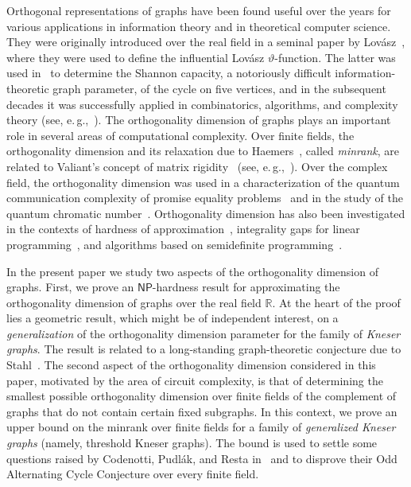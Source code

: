 \documentclass[11pt]{article}
\numberwithin{equation}{section}
\theoremstyle{definition}
\theoremstyle{plain}
\newcommand{\R}{\mathbb R}
\newcommand{\NP}{\mathsf{NP}}
\begin{document}
Orthogonal representations of graphs have been found useful over the years for various applications in information theory and in theoretical computer science.
They were originally introduced over the real field in a seminal
%
paper by  %
Lov\'asz~\cite{Lovasz79}, where they were used to define the influential Lov\'asz $\vartheta$-function. The latter was used in~\cite{Lovasz79} to determine the Shannon capacity, a notoriously difficult information-theoretic graph parameter, of the cycle on five vertices, and in the
%
subsequent decades  %
%
%
it was successfully applied in combinatorics, algorithms, and complexity theory (see, e.\,g.,~\cite{Tardos88,knuth1994sandwich,Feige97,AlonK98}).
%
%
%
The orthogonality dimension of graphs plays an important role in several areas of computational complexity.
Over finite fields, the orthogonality dimension and its
%
%
%
relaxation due to Haemers~\cite{Haemers79, Haemers81}, %
%
%
called \emph{minrank},  %
%
%
%
are related to Valiant's concept of matrix rigidity~\cite{Valiant77} (see, e.\,g.,~\cite{CodenottiPR00,Riis07,GolovnevRW17}).
Over the complex field, the orthogonality dimension was used in a characterization of the quantum communication complexity of promise equality problems~\cite{deWolfThesis,BrietBLPS15,BrietZ17} and in the study of the quantum chromatic number~\cite{CameronMNSW07,ScarpaS12}.
%
Orthogonality dimension   %
%
has also been %
investigated in the contexts of hardness of approximation~\cite{Peeters96,LangbergS08}, integrality gaps for linear programming~\cite{HuTS17,Haviv18topo}, and algorithms based on %
semidefinite  %
programming~\cite{ChlamtacH14,HavivMFCS19}.

%
In the present paper we study %
two aspects of the orthogonality dimension of graphs.
First, we prove an $\NP$-hardness result for approximating the orthogonality dimension of graphs over the real field $\R$.
At the heart of the proof lies a geometric result, which might be of independent interest, on a \emph{generalization}
of the orthogonality dimension parameter for the family of \emph{Kneser graphs}. The result is related to a long-standing graph-theoretic conjecture due to Stahl~\cite{Stahl76}.
The second aspect of the orthogonality dimension
%
%
considered in this %
paper,  %
motivated by the area of circuit complexity, is that of determining the smallest possible orthogonality dimension  over finite fields of the complement of graphs that do not contain certain fixed subgraphs. In this context, we prove %
an upper bound  %
on the minrank
%
%
over finite fields for 
%
%
a family of \emph{generalized Kneser graphs} (namely, threshold Kneser graphs).
The bound is used to settle %
some %
questions raised by Codenotti, Pudl{\'{a}}k, and Resta in~\cite{CodenottiPR00}
and to disprove their Odd Alternating Cycle Conjecture over every finite field.
\end{document}
